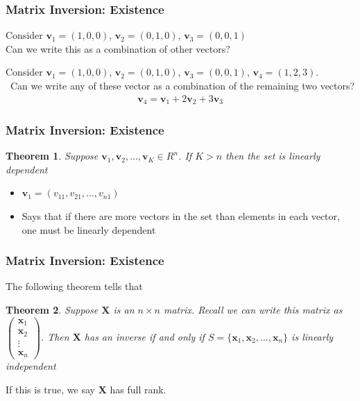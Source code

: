 \documentclass{beamer}
\newtheorem{thm}{Theorem}
\numberwithin{equation}{section}
\begin{document}
\begin{frame}
\frametitle{Matrix Inversion: Existence}

Consider $\boldsymbol{v}_{1} = (1, 0, 0)$, $\boldsymbol{v}_{2} = (0,1,0)$, $\boldsymbol{v}_{3} = (0,0,1)$ \\
Can we write this as a combination of other vectors?  \pause {}\pause 

Consider $\boldsymbol{v}_{1} = (1, 0, 0)$, $\boldsymbol{v}_{2} = (0,1,0)$, $\boldsymbol{v}_{3} = (0,0,1)$, $\boldsymbol{v}_{4} = (1, 2, 3)$.  \\\
Can we write any of these vector as a combination of the remaining two vectors?  \\ \pause 
\begin{eqnarray}
\boldsymbol{v}_{4} = \boldsymbol{v}_{1} + 2 \boldsymbol{v}_{2} + 3\boldsymbol{v}_{3} \nonumber  
\end{eqnarray}

\end{frame}


\begin{frame}
\frametitle{Matrix Inversion: Existence} 

\begin{thm} 
Suppose $\boldsymbol{v}_{1}, \boldsymbol{v}_2, \hdots, \boldsymbol{v}_{K} \in R^{n}$.  If $K>n$ then the set is linearly dependent 
\end{thm}
\pause 
\begin{itemize}
\item[-] $\boldsymbol{v}_{1} = (v_{11}, v_{21}, \hdots, v_{n1})$ \pause 
\item[-] Says that if there are more vectors in the set than elements in each vector, one must be linearly dependent 
\end{itemize}

\end{frame}



\begin{frame}
\frametitle{Matrix Inversion: Existence}

The following theorem tells that 

\begin{thm} Suppose $\boldsymbol{X} $ is an $n \times n$ matrix.  Recall we can write this matrix as 
$\begin{pmatrix} \boldsymbol{x}_{1} \\ \boldsymbol{x}_{2} \\ \vdots \\ \boldsymbol{x}_{n} \end{pmatrix}$.  Then $\boldsymbol{X}$ has an inverse if and only if $S = \{\boldsymbol{x}_{1} , \boldsymbol{x}_{2} ,  \hdots, \boldsymbol{x}_{n} \}$ is linearly independent 
\end{thm} \pause

If this is true, we say $\boldsymbol{X}$ has full rank.

\end{frame}
\end{document}

